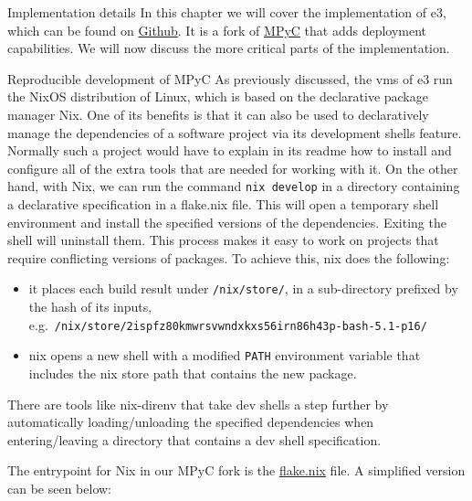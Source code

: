 \begin{frame}[fragile]{Implementation details}
\protect\hypertarget{implementation-details}{}
In this chapter we will cover the implementation of \gls{e3}, which can
be found on \href{https://github.com/e-nikolov/mpyc}{Github}. It is a
fork of \href{https://github.com/lschoe/mpyc}{MPyC} that adds deployment
capabilities. We will now discuss the more critical parts of the
implementation.

\begin{block}{Reproducible development of MPyC}
\protect\hypertarget{reproducible-development-of-mpyc}{}
As previously discussed, the \glspl{vm} of \gls{e3} run the NixOS
distribution of Linux, which is based on the declarative package manager
Nix. One of its benefits is that it can also be used to declaratively
manage the dependencies of a software project via its development shells
feature. Normally such a project would have to explain in its readme how
to install and configure all of the extra tools that are needed for
working with it. On the other hand, with Nix, we can run the command
\texttt{nix\ develop} in a directory containing a declarative
specification in a flake.nix file. This will open a temporary shell
environment and install the specified versions of the dependencies.
Exiting the shell will uninstall them. This process makes it easy to
work on projects that require conflicting versions of packages. To
achieve this, nix does the following:

\begin{itemize}
\tightlist
\item
  it places each build result under \texttt{/nix/store/}, in a
  sub-directory prefixed by the hash of its inputs,
  e.g.~\texttt{/nix/store/2ispfz80kmwrsvwndxkxs56irn86h43p-bash-5.1-p16/}
\item
  nix opens a new shell with a modified \texttt{PATH} environment
  variable that includes the nix store path that contains the new
  package.
\end{itemize}

There are tools like nix-direnv that take dev shells a step further by
automatically loading/unloading the specified dependencies when
entering/leaving a directory that contains a dev shell specification.

\newpage

The entrypoint for Nix in our MPyC fork is the
\href{https://github.com/e-nikolov/mpyc/blob/master/flake.nix}{flake.nix}
file. A simplified version can be seen below:


\end{block}
\end{frame}
